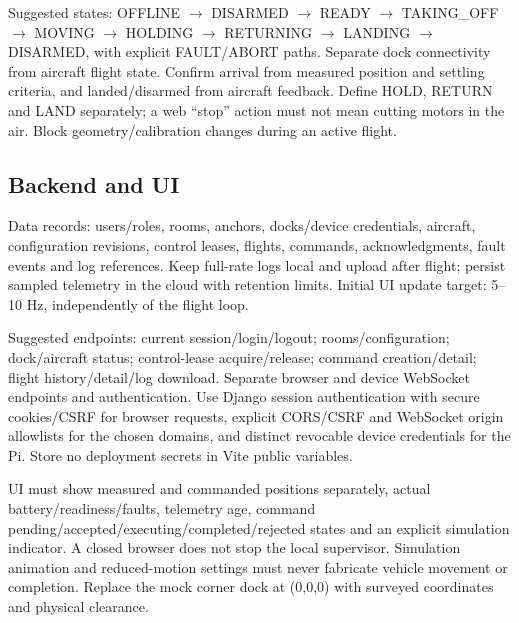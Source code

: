 \documentclass[10pt,letterpaper]{article}
\begin{document}
Suggested states: OFFLINE $\rightarrow$ DISARMED $\rightarrow$ READY $\rightarrow$ TAKING\_OFF $\rightarrow$ MOVING $\rightarrow$ HOLDING $\rightarrow$ RETURNING $\rightarrow$ LANDING $\rightarrow$ DISARMED, with explicit FAULT/ABORT paths. Separate dock connectivity from aircraft flight state. Confirm arrival from measured position and settling criteria, and landed/disarmed from aircraft feedback. Define HOLD, RETURN and LAND separately; a web ``stop'' action must not mean cutting motors in the air. Block geometry/calibration changes during an active flight.

\subsection{Backend and UI}
Data records: users/roles, rooms, anchors, docks/device credentials, aircraft, configuration revisions, control leases, flights, commands, acknowledgments, fault events and log references. Keep full-rate logs local and upload after flight; persist sampled telemetry in the cloud with retention limits. Initial UI update target: 5--10 Hz, independently of the flight loop.

Suggested endpoints: current session/login/logout; rooms/configuration; dock/aircraft status; control-lease acquire/release; command creation/detail; flight history/detail/log download. Separate browser and device WebSocket endpoints and authentication. Use Django session authentication with secure cookies/CSRF for browser requests, explicit CORS/CSRF and WebSocket origin allowlists for the chosen domains, and distinct revocable device credentials for the Pi. Store no deployment secrets in Vite public variables.

UI must show measured and commanded positions separately, actual battery/readiness/faults, telemetry age, command pending/accepted/executing/completed/rejected states and an explicit simulation indicator. A closed browser does not stop the local supervisor. Simulation animation and reduced-motion settings must never fabricate vehicle movement or completion. Replace the mock corner dock at (0,0,0) with surveyed coordinates and physical clearance.
\end{document}
